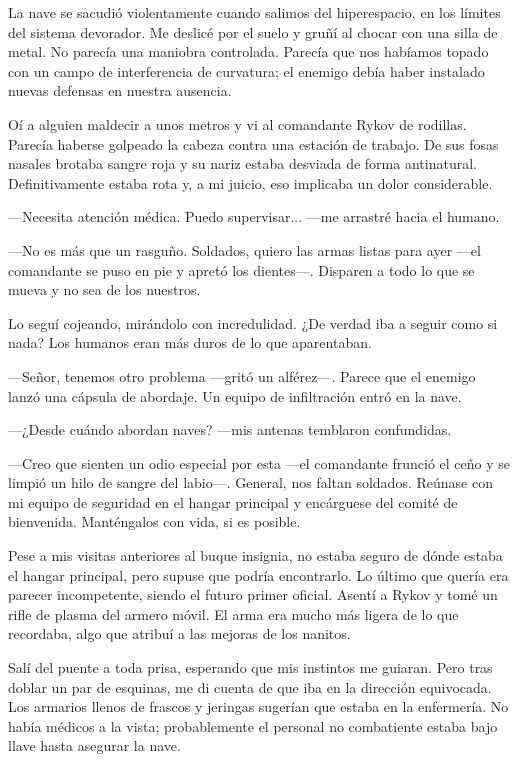 La nave se sacudió violentamente cuando salimos del hiperespacio, en los límites del sistema devorador. Me deslicé por el suelo y gruñí al chocar con una silla de metal. No parecía una maniobra controlada. Parecía que nos habíamos topado con un campo de interferencia de curvatura; el enemigo debía haber instalado nuevas defensas en nuestra ausencia.

Oí a alguien maldecir a unos metros y vi al comandante Rykov de rodillas. Parecía haberse golpeado la cabeza contra una estación de trabajo. De sus fosas nasales brotaba sangre roja y su nariz estaba desviada de forma antinatural. Definitivamente estaba rota y, a mi juicio, eso implicaba un dolor considerable.

—Necesita atención médica. Puedo supervisar... —me arrastré hacia el humano.

—No es más que un rasguño. Soldados, quiero las armas listas para ayer —el comandante se puso en pie y apretó los dientes—. Disparen a todo lo que se mueva y no sea de los nuestros.

Lo seguí cojeando, mirándolo con incredulidad. ¿De verdad iba a seguir como si nada? Los humanos eran más duros de lo que aparentaban.

—Señor, tenemos otro problema —gritó un alférez—. Parece que el enemigo lanzó una cápsula de abordaje. Un equipo de infiltración entró en la nave.

 —¿Desde cuándo abordan naves? —mis antenas temblaron confundidas.

—Creo que sienten un odio especial por esta —el comandante frunció el ceño y se limpió un hilo de sangre del labio—. General, nos faltan soldados. Reúnase con mi equipo de seguridad en el hangar principal y encárguese del comité de bienvenida. Manténgalos con vida, si es posible.

Pese a mis visitas anteriores al buque insignia, no estaba seguro de dónde estaba el hangar principal, pero supuse que podría encontrarlo. Lo último que quería era parecer incompetente, siendo el futuro primer oficial. Asentí a Rykov y tomé un rifle de plasma del armero móvil. El arma era mucho más ligera de lo que recordaba, algo que atribuí a las mejoras de los nanitos.

Salí del puente a toda prisa, esperando que mis instintos me guiaran. Pero tras doblar un par de esquinas, me di cuenta de que iba en la dirección equivocada. Los armarios llenos de frascos y jeringas sugerían que estaba en la enfermería. No había médicos a la vista; probablemente el personal no combatiente estaba bajo llave hasta asegurar la nave.

